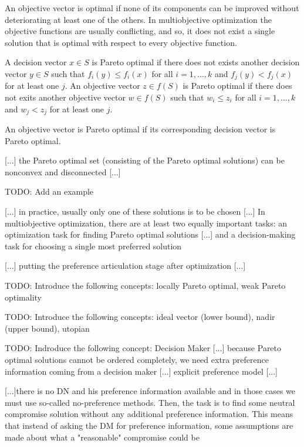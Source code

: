 {An objective vector is optimal if none of its components can be improved without deteriorating at least one of the others. In multiobjective optimization the objective functions are usually conflicting, and so, it does not exist a single solution that is optimal with respect to every objective function.

\begin{definition}
    A decision vector $x \in S$ is Pareto optimal if there does not exists another decision vector $y \in S$ such that $f_i(y) \leq f_i(x)$ for all $i = 1, \ldots, k$ and $f_j(y) < f_j(x)$ for at least one $j$. An objective vector $z \in f(S)$ is Pareto optimal if there does not exits another objective vector $w \in f(S)$ such that $w_i \leq z_i$ for all $i = 1, \ldots, k$ and $w_j < z_j$ for at least one $j$.
\end{definition}

An objective vector is Pareto optimal if its corresponding decision vector is Pareto optimal.

    {\color{red} [...] the Pareto optimal set (consisting of the Pareto optimal solutions) can be nonconvex and disconnected [...]}

    {\color{red} TODO: Add an example}

    {\color{red} [...] in practice, usually only one of these solutions is to be chosen [...] In multiobjective optimization, there are at least two equally important tasks: an optimization task for finding Pareto optimal solutions [...] and a decision-making task for choosing a single most preferred solution}

    {\color{red} [...] putting the preference articulation stage after optimization [...]}

    {\color{red} TODO: Introduce the following concepts: locally Pareto optimal, weak Pareto optimality}

    {\color{red} TODO: Introduce the following concepts: ideal vector (lower bound), nadir (upper bound), utopian}

    {\color{red} TODO: Indroduce the following concept: Decision Maker [...] because Pareto optimal solutions cannot be ordered completely, we need extra preference information coming from a decision maker [...] explicit preference model [...]}

    {\color{red} [...]there is no DN and his preference information available and in those cases we must use so-called no-preference methods. Then, the task is to find some neutral compromise solution without any additional preference information. This means that instead of asking the DM for preference information, some assumptions are made about what a "reasonable" compromise could be}

}
